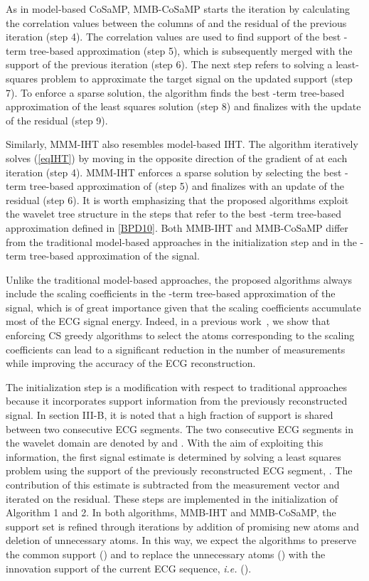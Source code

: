 \documentclass[journal]{IEEEtran}
\begin{document}
As in model-based CoSaMP, MMB-CoSaMP starts the iteration by calculating the correlation values between the columns of  and the residual of the previous iteration  (step 4).  The correlation values are used to find support of the best -term tree-based approximation (step 5), which is  subsequently merged with the support of the previous iteration (step 6). The next step refers to solving a least-squares problem to approximate the target signal on the updated support (step 7). To enforce a sparse solution, the algorithm finds the best -term tree-based approximation of the least squares solution (step 8) and finalizes with the update of the residual (step 9).

Similarly, MMM-IHT also resembles model-based IHT. The algorithm iteratively solves (\ref{eqIHT}) by moving in the opposite direction of the gradient of  at each iteration (step 4). MMM-IHT enforces a sparse solution by selecting the best -term tree-based approximation of  (step 5) and finalizes with an update of the residual (step 6). It is worth emphasizing that the proposed algorithms exploit the wavelet tree structure in the steps that refer to the best -term tree-based approximation defined in \eqref{BPD10}. Both MMB-IHT and MMB-CoSaMP differ from the traditional model-based approaches in the initialization step and in the -term tree-based approximation of the signal.

Unlike the traditional model-based approaches, the proposed algorithms always include the scaling coefficients in the -term tree-based approximation of the signal, which is of great importance given that the scaling coefficients accumulate most of the ECG signal energy. Indeed, in a previous work~\cite{Carr10}, we show that enforcing CS greedy algorithms to select the atoms corresponding to the scaling coefficients can lead to a significant reduction in the number of measurements while improving the accuracy of the ECG reconstruction.

The initialization step is a modification with respect to traditional approaches because it incorporates support information from the previously reconstructed signal. In section III-B, it is noted that a high fraction of support is shared between two consecutive ECG segments. The two consecutive ECG segments in the wavelet domain are denoted by  and . With the aim of exploiting this information, the first signal estimate is determined by solving a least squares problem using the support of the previously reconstructed ECG segment, . The contribution of this estimate is subtracted from the measurement vector and iterated on the residual. These steps are implemented in the initialization of Algorithm 1 and 2. In both algorithms, MMB-IHT and MMB-CoSaMP, the support set is refined through iterations by addition of promising new atoms and deletion of unnecessary atoms. In this way, we expect the algorithms to preserve the common support () and to replace the unnecessary atoms () with the innovation support of the current ECG sequence, \textit{i.e.} ().
\end{document}
